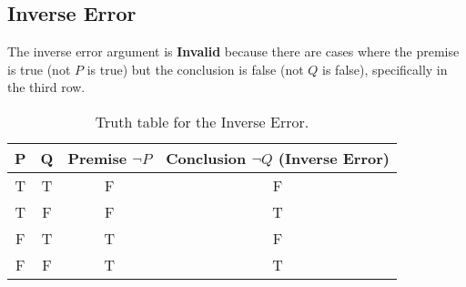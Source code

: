 \documentclass{amsart}
\theoremstyle{definition}
\theoremstyle{Exercise}
\theoremstyle{remark}
\theoremstyle{rule}
\numberwithin{equation}{section}
\begin{document}
\begin{enumerate}[label=(\alph*)]
    \subsection*{Inverse Error}
    The inverse error argument is \textbf{Invalid} because there are cases where the premise is true (not \( P \) is true) but the conclusion is false (not \( Q \) is false), specifically in the third row.
    
    \begin{table}[h]
      \centering
      \begin{tabular}{cccc}
        \toprule
        P & Q & Premise \(\neg P\) & Conclusion \(\neg Q\) (Inverse Error) \\
        \midrule
        T & T & F                  & F                                     \\
        T & F & F                  & T                                     \\
        F & T & T                  & F                                     \\
        F & F & T                  & T                                     \\
        \bottomrule
      \end{tabular}
      \caption{Truth table for the Inverse Error.}
      \label{tab:inverse_error}
    \end{table}
\\\\
\end{enumerate}
\end{document}
